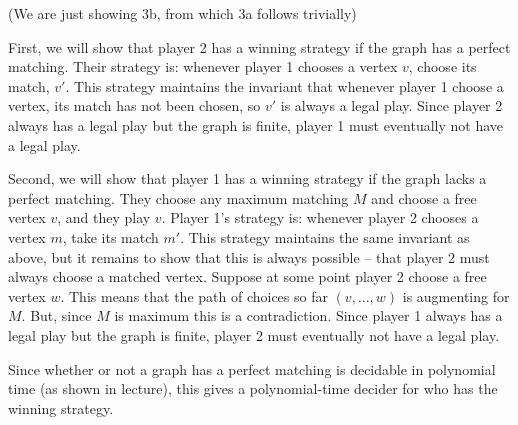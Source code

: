 \documentclass{hmcpset}
\begin{document}
\begin{solution}
(We are just showing 3b, from which 3a follows trivially)

First, we will show that player 2 has a winning strategy if the graph has a perfect matching. Their strategy is: whenever player 1 chooses a vertex $v$, choose its match, $v'$. This strategy maintains the invariant that whenever player 1 choose a vertex, its match has not been chosen, so $v'$ is always a legal play. Since player 2 always has a legal play but the graph is finite, player 1 must eventually not have a legal play.

Second, we will show that player 1 has a winning strategy if the graph lacks a perfect matching. They choose any maximum matching $M$ and choose a free vertex $v$, and they play $v$. Player 1's strategy is: whenever player 2 chooses a vertex $m$, take its match $m'$. This strategy maintains the same invariant as above, but it remains to show that this is always possible -- that player 2 must always choose a matched vertex. Suppose at some point player 2 choose a free vertex $w$. This means that the path of choices so far $(v,...,w)$ is augmenting for $M$. But, since $M$ is maximum this is a contradiction. Since player 1 always has a legal play but the graph is finite, player 2 must eventually not have a legal play.

Since whether or not a graph has a perfect matching is decidable in polynomial time (as shown in lecture), this gives a polynomial-time decider for who has the winning strategy.

\end{solution}
\end{document}

